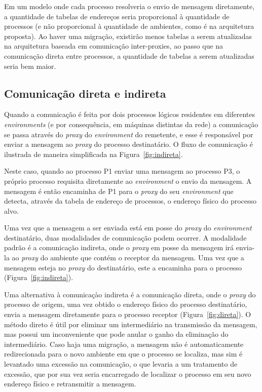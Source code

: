 Em um modelo onde cada processo resolveria o envio de mensagem diretamente, a quantidade de tabelas de endereços seria proporcional à quantidade de processos (e não proporcional à quantidade de ambientes, como é na arquitetura proposta). Ao haver uma migração, existirão menos tabelas a serem atualizadas na arquitetura baseada em comunicação inter-proxies, ao passo que na comunicação direta entre processos, a quantidade de tabelas a serem atualizadas seria bem maior.

\subsection{Comunicação direta e indireta}

Quando a comunicação é feita por dois processos lógicos residentes em diferentes \textit{environments} (e por consequência, em máquinas distintas da rede) a comunicação se passa através do \textit{proxy} do \textit{environment} do remetente, e esse é responsável por enviar a mensagem ao \textit{proxy} do processo destinatário. O fluxo de comunicação é ilustrada de maneira simplificada na Figura~\ref{fig:indireta}.

Neste caso, quando ao processo P1 enviar uma mensagem ao processo P3, o próprio processo requisita diretamente ao \textit{environment} o envio da mensagem. A mensagem é então encaminha de P1 para o \textit{proxy} do seu \textit{environment} que detecta, através da tabela de endereço de processos, o endereço físico do processo alvo. 

Uma vez que a mensagem a ser enviada está em posse do \textit{proxy} do \textit{environment} destinatário, duas modalidades de comunicação podem ocorrer. A modalidade padrão é a comunicação indireta, onde o \textit{proxy} em posse da mensagem irá envia-la ao \textit{proxy} do ambiente que contém o receptor da mensagem. Uma vez que a mensagem esteja no \textit{proxy} do destinatário, este a encaminha para o processo (Figura~\ref{fig:indireta}).

Uma alternativa à comunicaçào indireta é a comunicação direta, onde o \textit{proxy} do processo de origem, uma vez obtido o endereço físico do processo destinatário, envia a mensagem diretamente para o processo receptor (Figura~\ref{fig:direta}). O método direto é útil por eliminar um intermediário na transmissão da mensagem, mas possui um inconveniente que pode anular o ganho da eliminação do intermediário. Caso haja uma migração, a mensagem não é automaticamente redirecionada para o novo ambiente em que o processo se localiza, mas sim é levantado uma excessão na comunicação, o que levaria a um tratamento de excessão, que por sua vez seria encarregado de localizar o processo em seu novo endereço físico e retransmitir a mensagem.

